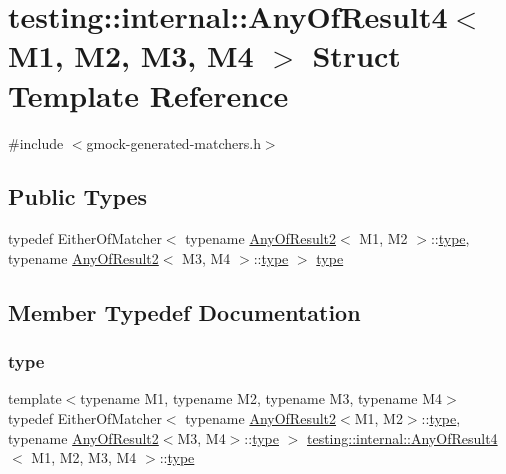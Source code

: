 \hypertarget{structtesting_1_1internal_1_1_any_of_result4}{}\section{testing\+::internal\+::Any\+Of\+Result4$<$ M1, M2, M3, M4 $>$ Struct Template Reference}
\label{structtesting_1_1internal_1_1_any_of_result4}


{\ttfamily \#include $<$gmock-\/generated-\/matchers.\+h$>$}

\subsection*{Public Types}
\begin{DoxyCompactItemize}
\item 
typedef Either\+Of\+Matcher$<$ typename \mbox{\hyperlink{structtesting_1_1internal_1_1_any_of_result2}{Any\+Of\+Result2}}$<$ M1, M2 $>$\+::\mbox{\hyperlink{structtesting_1_1internal_1_1_any_of_result4_a4f3c9aebb4f7fc24287b59a0bdf1a4a6}{type}}, typename \mbox{\hyperlink{structtesting_1_1internal_1_1_any_of_result2}{Any\+Of\+Result2}}$<$ M3, M4 $>$\+::\mbox{\hyperlink{structtesting_1_1internal_1_1_any_of_result4_a4f3c9aebb4f7fc24287b59a0bdf1a4a6}{type}} $>$ \mbox{\hyperlink{structtesting_1_1internal_1_1_any_of_result4_a4f3c9aebb4f7fc24287b59a0bdf1a4a6}{type}}
\end{DoxyCompactItemize}


\subsection{Member Typedef Documentation}
\mbox{\label{structtesting_1_1internal_1_1_any_of_result4_a4f3c9aebb4f7fc24287b59a0bdf1a4a6}} 
\subsubsection{\texorpdfstring{type}{type}}
{\footnotesize\ttfamily template$<$typename M1, typename M2, typename M3, typename M4$>$ \\
typedef Either\+Of\+Matcher$<$ typename \mbox{\hyperlink{structtesting_1_1internal_1_1_any_of_result2}{Any\+Of\+Result2}}$<$M1, M2$>$\+::\mbox{\hyperlink{structtesting_1_1internal_1_1_any_of_result4_a4f3c9aebb4f7fc24287b59a0bdf1a4a6}{type}}, typename \mbox{\hyperlink{structtesting_1_1internal_1_1_any_of_result2}{Any\+Of\+Result2}}$<$M3, M4$>$\+::\mbox{\hyperlink{structtesting_1_1internal_1_1_any_of_result4_a4f3c9aebb4f7fc24287b59a0bdf1a4a6}{type}} $>$ \mbox{\hyperlink{structtesting_1_1internal_1_1_any_of_result4}{testing\+::internal\+::\+Any\+Of\+Result4}}$<$ M1, M2, M3, M4 $>$\+::\mbox{\hyperlink{structtesting_1_1internal_1_1_any_of_result4_a4f3c9aebb4f7fc24287b59a0bdf1a4a6}{type}}}




